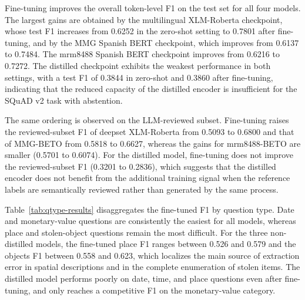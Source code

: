 \documentclass[graybox]{SNmult}
\begin{document}
Fine-tuning improves the overall token-level F1 on the test set for all four
models. The largest gains are obtained by the multilingual XLM-Roberta
checkpoint, whose test F1 increases from 0.6252 in the zero-shot setting to
0.7801 after fine-tuning, and by the MMG Spanish BERT checkpoint, which
improves from 0.6137 to 0.7484. The mrm8488 Spanish BERT checkpoint improves
from 0.6216 to 0.7272. The distilled checkpoint exhibits the weakest
performance in both settings, with a test F1 of 0.3844 in zero-shot and 0.3860
after fine-tuning, indicating that the reduced capacity of the distilled
encoder is insufficient for the SQuAD v2 task with abstention.

The same ordering is observed on the LLM-reviewed subset. Fine-tuning
raises the reviewed-subset F1 of deepset XLM-Roberta from 0.5093 to 0.6800 and that of
MMG-BETO from 0.5818 to 0.6627, whereas the gains for mrm8488-BETO are smaller
(0.5701 to 0.6074). For the distilled model, fine-tuning does not improve the
reviewed-subset F1 (0.3201 to 0.2836), which suggests that the distilled encoder does not
benefit from the additional training signal when the reference labels are
semantically reviewed rather than generated by the same process.

Table~\ref{tab:qtype-results} disaggregates the fine-tuned F1 by question
type. Date and monetary-value questions are consistently the easiest for all
models, whereas place and stolen-object questions remain the most difficult.
For the three non-distilled models, the fine-tuned place F1 ranges between
0.526 and 0.579 and the objects F1 between 0.558 and 0.623, which localizes
the main source of extraction error in spatial descriptions and in the
complete enumeration of stolen items. The distilled model performs poorly on
date, time, and place questions even after fine-tuning, and only reaches a
competitive F1 on the monetary-value category.
\end{document}
